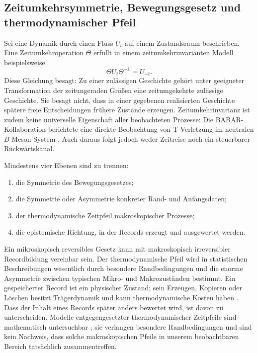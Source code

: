 \documentclass[11pt,a4paper]{article}
\theoremstyle{remark}
\begin{document}
\subsection{Zeitumkehrsymmetrie, Bewegungsgesetz und thermodynamischer Pfeil}

Sei eine Dynamik durch einen Fluss \(U_t\) auf einem Zustandsraum beschrieben.
Eine Zeitumkehroperation \(\Theta\) erfüllt in einem zeitumkehrinvarianten
Modell beispielsweise
\begin{equation}
\label{eq:time-reversal}
  \Theta U_t\Theta^{-1}=U_{-t}.
\end{equation}
Diese Gleichung besagt: Zu einer zulässigen Geschichte gehört unter
geeigneter Transformation der zeitungeraden Größen eine zeitumgekehrte
zulässige Geschichte. Sie besagt nicht, dass in einer gegebenen realisierten
Geschichte spätere freie Entscheidungen frühere Zustände erzeugen.
Zeitumkehrinvarianz ist zudem keine universelle Eigenschaft aller beobachteten
Prozesse: Die BABAR-Kollaboration berichtete eine direkte Beobachtung von
T-Verletzung im neutralen \(B\)-Meson-System \citep{BABAR2012}. Auch daraus
folgt jedoch weder Zeitreise noch ein steuerbarer Rückwärtskanal.

Mindestens vier Ebenen sind zu trennen:
\begin{enumerate}
  \item die Symmetrie des Bewegungsgesetzes;
  \item die Symmetrie oder Asymmetrie konkreter Rand- und Anfangsdaten;
  \item der thermodynamische Zeitpfeil makroskopischer Prozesse;
  \item die epistemische Richtung, in der Records erzeugt und ausgewertet
  werden.
\end{enumerate}
Ein mikroskopisch reversibles Gesetz kann mit makroskopisch irreversibler
Recordbildung vereinbar sein. Der thermodynamische Pfeil wird in statistischen
Beschreibungen wesentlich durch besondere Randbedingungen und die enorme
Asymmetrie zwischen typischen Mikro- und Makrozuständen bestimmt. Ein
gespeicherter Record ist ein physischer Zustand; sein Erzeugen, Kopieren oder
Löschen besitzt Trägerdynamik und kann thermodynamische Kosten haben
\citep{landauer1961}. Dass der Inhalt eines Records später anders bewertet
wird, ist davon zu unterscheiden. Modelle entgegengesetzter
thermodynamischer Zeitpfeile sind mathematisch untersuchbar
\citep{Schulman1999}; sie verlangen besondere Randbedingungen und sind kein
Nachweis, dass solche makroskopischen Pfeile in unserem beobachtbaren Bereich
tatsächlich zusammentreffen.
\end{document}
